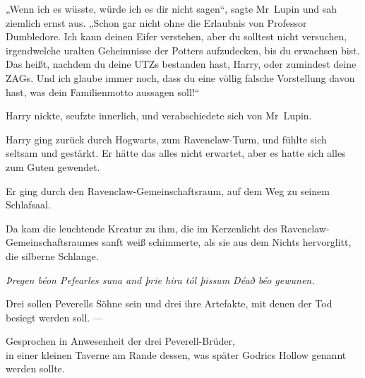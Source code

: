 „Wenn ich es wüsste, würde ich es dir nicht sagen“, sagte Mr~Lupin und sah ziemlich ernst aus.
„Schon gar nicht ohne die Erlaubnis von Professor Dumbledore. Ich kann deinen Eifer verstehen, aber du solltest nicht versuchen, irgendwelche uralten Geheimnisse der Potters aufzudecken, bis du erwachsen bist. Das heißt, nachdem du deine UTZs bestanden hast, Harry, oder zumindest deine ZAGs. Und ich glaube immer noch, dass du eine völlig falsche Vorstellung davon hast, was dein Familienmotto aussagen soll!“

Harry nickte, seufzte innerlich, und verabschiedete sich von Mr~Lupin.

\later

Harry ging zurück durch Hogwarts, zum Ravenclaw-Turm, und fühlte sich seltsam und gestärkt. Er hätte das alles nicht erwartet, aber es hatte sich alles zum Guten gewendet.

Er ging durch den Ravenclaw-Gemeinschaftsraum, auf dem Weg zu seinem Schlafsaal.

Da kam die leuchtende Kreatur zu ihm, die im Kerzenlicht des Ravenclaw-Gemeinschaftsraumes sanft weiß schimmerte, als sie aus dem Nichts hervorglitt, die silberne Schlange.

\later

\begin{center}
\emph{Þregen béon Pefearles suna and þrie hira tól þissum Déað béo gewunen.}

Drei sollen Peverells Söhne sein und drei ihre Artefakte, mit denen der Tod besiegt werden soll. —

Gesprochen in Anwesenheit der drei Peverell-Brüder,\\
in einer kleinen Taverne am Rande dessen, was später Godrics Hollow genannt werden sollte.
\end{center}

